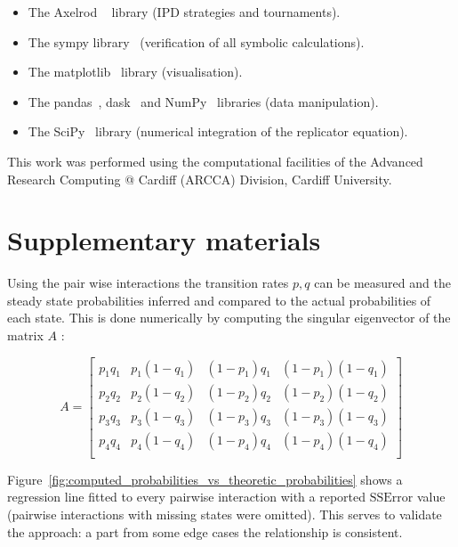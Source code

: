 \documentclass[a4paper]{article}
\begin{document}
\begin{itemize}
    \item The Axelrod ~\cite{Knight2016, Knight2018} library (IPD strategies and
        tournaments).
    \item The sympy library~\cite{Meurer2017} (verification of all symbolic
        calculations).
    \item The matplotlib~\cite{Droettboom2018} library (visualisation).
    \item The pandas~\cite{Structures2010}, dask~\cite{Dask2016} and
        NumPy~\cite{Oliphant2015} libraries (data manipulation).
    \item The SciPy~\cite{Jones2001} library (numerical integration of the
        replicator equation).
\end{itemize}

This work was performed using the computational facilities of the Advanced
Research Computing @ Cardiff (ARCCA) Division, Cardiff University.

\printbibliography

\newpage
\section*{Supplementary materials}




\newpage

Using the pair wise interactions the transition rates \(p,
q\) can be measured and the steady state probabilities inferred and compared to
the actual probabilities of each state.
This is done numerically by computing the singular eigenvector of the
matrix \(A\) \cite{Stewart2009}:

\[
    A =
    \begin{bmatrix}
        p_1 q_1 & p_1 (1 - q_1) & (1 - p_1) q_1 & (1 -p_1) (1 - q_1) \\
        p_2 q_2 & p_2 (1 - q_2) & (1 - p_2) q_2 & (1 -p_2) (1 - q_2) \\
        p_3 q_3 & p_3 (1 - q_3) & (1 - p_3) q_3 & (1 -p_3) (1 - q_3) \\
        p_4 q_4 & p_4 (1 - q_4) & (1 - p_4) q_4 & (1 -p_4) (1 - q_4) \\
    \end{bmatrix}
\]

Figure~\ref{fig:computed_probabilities_vs_theoretic_probabilities} shows a
regression line fitted to every pairwise interaction with a reported
\(\text{SSError}\) value (pairwise interactions with missing states were
omitted). This serves to validate the approach: a part from some edge cases the
relationship is consistent.
\end{document}

